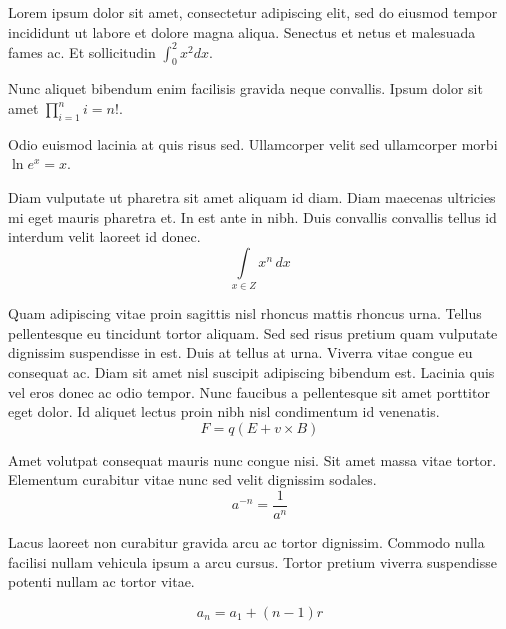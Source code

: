 \documentclass{article}
\begin{document}
Lorem ipsum dolor sit amet, consectetur adipiscing elit, sed do eiusmod tempor incididunt ut labore et dolore magna aliqua. Senectus et netus et malesuada fames ac. Et sollicitudin \begin{math}
	\int_0^2x^2dx
\end{math}.\newline
 
Nunc aliquet bibendum enim facilisis gravida neque convallis. Ipsum dolor sit amet $ \prod_{i=1}^ni=n! $.\newline
    
Odio euismod lacinia at quis risus sed. Ullamcorper velit sed ullamcorper morbi \( \ln e^x = x \).\newline

Diam vulputate ut pharetra sit amet aliquam id diam. Diam maecenas ultricies mi eget mauris pharetra et. In est ante in nibh. Duis convallis convallis tellus id interdum velit laoreet id donec. 
\[ \int\limits_{x\in Z}\! x^{n}\, dx \]

Quam adipiscing vitae proin sagittis nisl rhoncus mattis rhoncus urna. Tellus pellentesque eu tincidunt tortor aliquam. Sed sed risus pretium quam vulputate dignissim suspendisse in est. Duis at tellus at urna. Viverra vitae congue eu consequat ac. Diam sit amet nisl suscipit adipiscing bibendum est. Lacinia quis vel eros donec ac odio tempor. Nunc faucibus a pellentesque sit amet porttitor eget dolor. Id aliquet lectus proin nibh nisl condimentum id venenatis.
$$ F=q\left ( E+v \times B \right ) $$

Amet volutpat consequat mauris nunc congue nisi. Sit amet massa vitae tortor. Elementum curabitur vitae nunc sed velit dignissim sodales. 
\begin{displaymath}
	a^{-n}=\frac{1}{a^{n}}
\end{displaymath}

Lacus laoreet non curabitur gravida arcu ac tortor dignissim. Commodo nulla facilisi nullam vehicula ipsum a arcu cursus. Tortor pretium viverra suspendisse potenti nullam ac tortor vitae. 

\begin{equation}
	a_{n}=a_{1}+(n-1)r
\end{equation}
\end{document}
